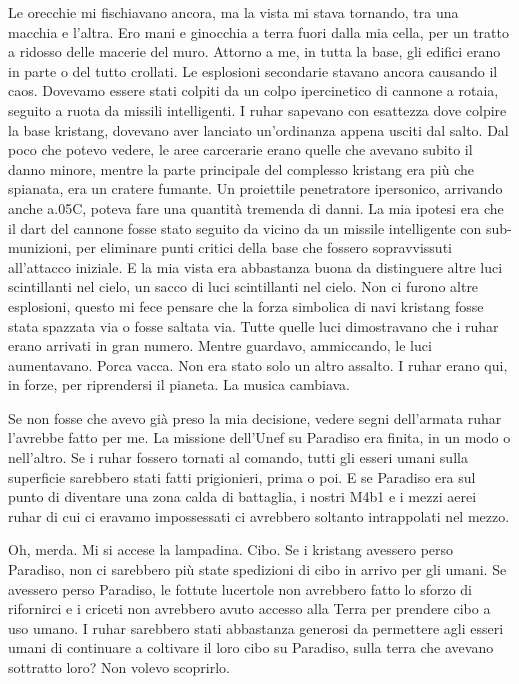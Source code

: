 Le orecchie mi fischiavano ancora, ma la vista mi stava tornando, tra
una macchia e l'altra. Ero mani e ginocchia a terra fuori dalla mia
cella, per un tratto a ridosso delle macerie del muro. Attorno a me, in
tutta la base, gli edifici erano in parte o del tutto crollati. Le
esplosioni secondarie stavano ancora causando il caos. Dovevamo essere
stati colpiti da un colpo ipercinetico di cannone a rotaia, seguito a
ruota da missili intelligenti. I ruhar sapevano con esattezza dove
colpire la base kristang, dovevano aver lanciato un'ordinanza appena
usciti dal salto. Dal poco che potevo vedere, le aree carcerarie erano
quelle che avevano subito il danno minore, mentre la parte principale
del complesso kristang era più che spianata, era un cratere fumante. Un
proiettile penetratore ipersonico, arrivando anche a.05C, poteva fare
una quantità tremenda di danni. La mia ipotesi era che il dart del
cannone fosse stato seguito da vicino da un missile intelligente con
sub-munizioni, per eliminare punti critici della base che fossero
sopravvissuti all'attacco iniziale. E la mia vista era abbastanza buona
da distinguere altre luci scintillanti nel cielo, un sacco di luci
scintillanti nel cielo. Non ci furono altre esplosioni, questo mi fece
pensare che la forza simbolica di navi kristang fosse stata spazzata via
o fosse saltata via. Tutte quelle luci dimostravano che i ruhar erano
arrivati in gran numero. Mentre guardavo, ammiccando, le luci
aumentavano. Porca vacca. Non era stato solo un altro assalto. I ruhar
erano qui, in forze, per riprendersi il pianeta. La musica cambiava.

Se non fosse che avevo già preso la mia decisione, vedere segni
dell'armata ruhar l'avrebbe fatto per me. La missione dell'Unef su
Paradiso era finita, in un modo o nell'altro. Se i ruhar fossero tornati
al comando, tutti gli esseri umani sulla superficie sarebbero stati
fatti prigionieri, prima o poi. E se Paradiso era sul punto di diventare
una zona calda di battaglia, i nostri M4b1 e i mezzi aerei ruhar di cui
ci eravamo impossessati ci avrebbero soltanto intrappolati nel mezzo.

Oh, merda. Mi si accese la lampadina. Cibo. Se i kristang avessero perso
Paradiso, non ci sarebbero più state spedizioni di cibo in arrivo per
gli umani. Se avessero perso Paradiso, le fottute lucertole non
avrebbero fatto lo sforzo di rifornirci e i criceti non avrebbero avuto
accesso alla Terra per prendere cibo a uso umano. I ruhar sarebbero
stati abbastanza generosi da permettere agli esseri umani di continuare
a coltivare il loro cibo su Paradiso, sulla terra che avevano sottratto
loro? Non volevo scoprirlo.

